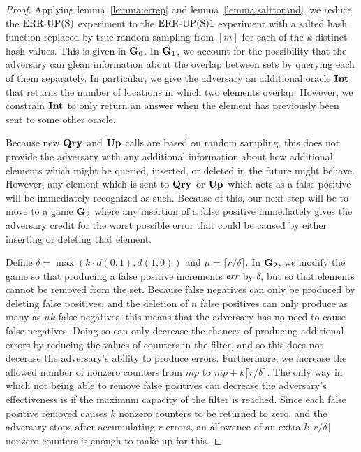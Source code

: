 \begin{proof}
Applying lemma~\ref{lemma:errep} and lemma~\ref{lemma:salttorand}, we reduce the $\textnormal{ERR\mbox{-}UP(S)}$ experiment to the $\textnormal{ERR\mbox{-}UP(S)}1$ experiment with a salted hash function replaced by true random sampling from $[m]$ for each of the $k$ distinct hash values. This is given in $\mathbf{G}\hspace{0.5pt}_0$. In $\mathbf{G}\hspace{0.5pt}_1$, we account for the possibility that the adversary can glean information about the overlap between sets by querying each of them separately. In particular, we give the adversary an additional oracle $\mathbf{Int}\hspace{0.5pt}$ that returns the number of locations in which two elements overlap. However, we constrain $\mathbf{Int}\hspace{0.5pt}$ to only return an answer when the element has previously been sent to some other oracle.

Because new $\mathbf{Qry}\hspace{0.5pt}$ and $\mathbf{Up}\hspace{0.5pt}$ calls are based on random sampling, this does not provide the adversary with any additional information about how additional elements which might be queried, inserted, or deleted in the future might behave. However, any element which is sent to $\mathbf{Qry}\hspace{0.5pt}$ or $\mathbf{Up}\hspace{0.5pt}$ which acts as a false positive will be immediately recognized as such. Because of this, our next step will be to move to a game $\mathbf{G}\hspace{0.5pt}_2$ where any insertion of a false positive immediately gives the adversary credit for the worst possible error that could be caused by either inserting or deleting that element.

Define $\delta = \max(k \cdot d(0,1), d(1,0))$ and $\mu = \lceil r/\delta \rceil$. In $\mathbf{G}\hspace{0.5pt}_2$, we modify the game so that producing a false positive increments $\textit{err}$ by $\delta$, but so that elements cannot be removed from the set. Because false negatives can only be produced by deleting false positives, and the deletion of $n$ false positives can only produce as many as $nk$ false negatives, this means that the adversary has no need to cause false negatives. Doing so can only decrease the chances of producing additional errors by reducing the values of counters in the filter, and so this does not decerase the adversary's ability to produce errors. Furthermore, we increase the allowed number of nonzero counters from $mp$ to $mp + k\lceil r/\delta \rceil$. The only way in which not being able to remove false positives can decrease the adversary's effectiveness is if the maximum capacity of the filter is reached. Since each false positive removed causes $k$ nonzero counters to be returned to zero, and the adversary stops after accumulating $r$ errors, an allowance of an extra $k\lceil r/\delta \rceil$ nonzero counters is enough to make up for this.


\end{proof}
